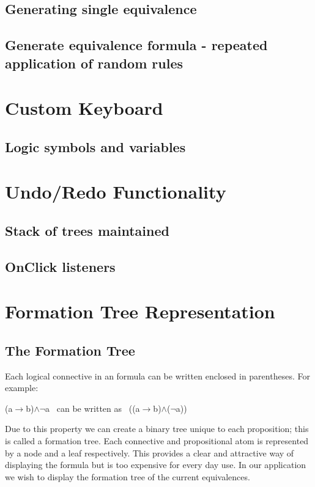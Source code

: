 \documentclass{report}
\begin{document}
\subsection{Generating single equivalence}
\subsection{Generate equivalence formula - repeated application of random rules}

\section{Custom Keyboard}
\subsection{Logic symbols and variables}

\section{Undo/Redo Functionality}
\subsection{Stack of trees maintained}
\subsection{OnClick listeners}

\section{Formation Tree Representation}

\subsection{The Formation Tree}

Each logical connective in an formula can be written enclosed in parentheses. For example:

\begin{center}
(a$\to$b)$\land$$\neg$a \ can be written as \ ((a$\to$b)$\land$($\neg$a))
\end{center}

Due to this property we can create a binary tree unique to each proposition; this is called a formation tree. Each connective and propositional atom is represented by a node and a leaf respectively. This provides a clear and attractive way of displaying the formula but is too expensive for every day use. In our application we wish to display the formation tree of the current equivalences.
\end{document}
